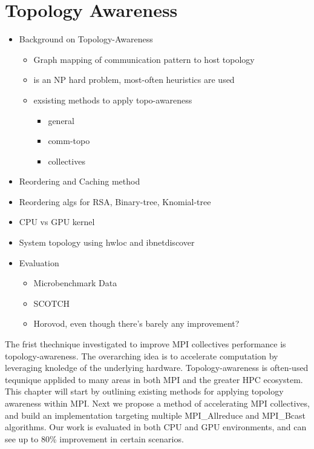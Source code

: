 
\glsresetall %
\chapter[Topology]{Topology Awareness}\label{ch:TopologyAwareness}


\begin{itemize}
    \item Background on Topology-Awareness
    \begin{itemize}
        \item Graph mapping of communication pattern to host topology
        \item is an NP hard problem, most-often heuristics are used
        \item exsisting methods to apply topo-awareness
        \begin{itemize}
            \item general \cite{Hoefler2011GenericTopoMappingStrats, Mirsadeghi2016TopoAwareCollRR, Mirsadeghi2016MAGC}
            \item comm-topo \cite{Gropp2019CartTopoMapping}
            \item collectives \cite{Mercer2011ImprvMPIWithRR, Mirsadeghi2016TopoAwareCollRR}
        \end{itemize}
    \end{itemize}
    \item Reordering and Caching method
    \item Reordering algs for RSA, Binary-tree, Knomial-tree
    \item CPU vs GPU kernel
    \item System topology using hwloc and ibnetdiscover
    \item Evaluation
    \begin{itemize}
        \item Microbenchmark Data
        \item SCOTCH \cite{Pellegrini2012SCOTCH}
        \item Horovod, even though there's barely any improvement?
    \end{itemize}
\end{itemize}

The frist thechnique investigated to improve MPI collectives performance is topology-awareness.
The overarching idea is to accelerate computation by leveraging knoledge of the underlying hardware.
Topology-awareness is often-used tequnique applided to many areas in both MPI and the greater HPC ecosystem.
This chapter will start by outlining existing methods for applying topology awareness within MPI.
Next we propose a method of accelerating MPI collectives, and build an implementation targeting multiple MPI\_Allreduce and MPI\_Bcast algorithms.
Our work is evaluated in both CPU and GPU environments, and can see up to 80\% improvement in certain scenarios.


